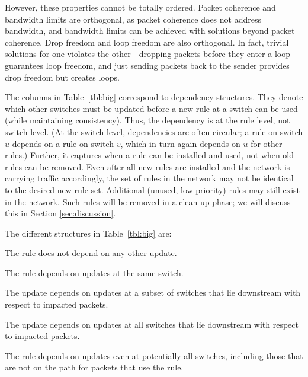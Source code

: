 However, these properties cannot be totally ordered. Packet coherence and bandwidth limits are orthogonal, as packet coherence does not address bandwidth, and bandwidth limits can be achieved with solutions beyond packet coherence.
Drop freedom and loop freedom are also orthogonal. In fact, trivial solutions for one violates the other---dropping packets before they enter a loop guarantees loop freedom, and just sending packets back to the sender provides drop freedom but creates loops.


The columns in Table~\ref{tbl:big} correspond to dependency structures. They denote which other switches must be updated before a new rule at a switch can be used (while maintaining consistency). Thus, the dependency is at the rule level, not switch level. (At the switch level, dependencies are often circular; a rule on switch $u$ depends on a rule on switch $v$, which in turn again depends on $u$ for other rules.)
Further, it captures when a rule can be installed and used, not when old rules can be removed. Even after all new rules are installed and the network is carrying traffic accordingly, the set of rules in the network may not be identical to the desired new rule set. Additional (unused, low-priority) rules may still exist in the network. Such rules will be removed in a clean-up phase;
we will discuss this in Section \ref{sec:discussion}.

The different structures in Table~\ref{tbl:big} are:

 The rule does not depend on any other update.

 The rule depends on updates at the same switch.

 The update depends on updates at a subset of switches that lie downstream with respect to impacted packets.

 The update depends on updates at all switches that lie downstream with respect to impacted packets.

 The rule depends on updates even at potentially all switches, including those that are not on the path for packets that use the rule.

